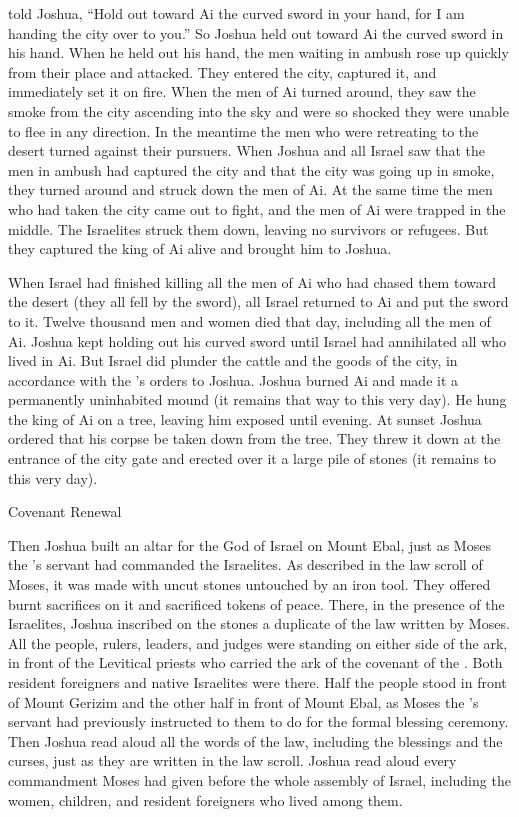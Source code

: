 {told
Joshua,
“Hold out
toward
Ai
the curved
sword in your hand,
for
I am handing
the city
over
to you.” So
Joshua
held
out toward Ai the curved
sword in his hand.
When he held
out his hand,
the men waiting
in ambush
rose
up quickly
from their place
and attacked. They entered
the city,
captured
it, and immediately
set
it on fire.
When the men
of Ai
turned
around,
they saw
the smoke
from the city
ascending
into
the sky
and were
so shocked
they were unable
to flee
in any direction.
In the meantime
the men
who were retreating
to the desert
turned
against their pursuers.
When Joshua
and all
Israel
saw
that
the men in ambush
had captured
the
city
and that
the city
was going up
in smoke,
they turned
around and struck
down the
men
of Ai.
At the same time the men
who had taken the city
came out
to fight,
and the men
of Ai were
trapped in the middle.
The Israelites
struck
them down,
leaving
no
survivors
or refugees.
But they captured
the king
of Ai
alive
and brought
him to
Joshua.
\par }{\PP {}When
Israel
had finished
killing
all
the men of Ai
who had
chased
them toward the desert
(they all
fell
by the sword), all
Israel
returned
to Ai
and put
the sword to it.
Twelve
thousand
men
and women
died
that day,
including
all
the men
of Ai.
Joshua
kept holding
out
his curved
sword until
Israel had
annihilated
all
who lived
in Ai.
But
Israel
did
plunder the cattle
and the goods
of the city,
in accordance
with the
{}’s
orders
to Joshua.
Joshua
burned
Ai
and made
it a permanently
uninhabited
mound
(it remains that way to
this
very day).
He hung
the king
of Ai
on
a tree,
leaving him exposed until
evening.
At sunset
Joshua
ordered
that his corpse
be taken down
from
the tree.
They threw
it down
at
the entrance
of the city
gate
and erected
over
it a large
pile
of stones
(it remains to this
very day).
\par }{\SH Covenant Renewal
\par }{\PP {}Then
Joshua
built
an altar
for the
{}
God
of Israel
on Mount
Ebal,
just
as Moses
the
{}’s
servant
had commanded
the Israelites.
As described in
the law
scroll
of Moses,
it was made with uncut
stones
untouched by an iron
tool.
They offered
burnt sacrifices
on
it
and sacrificed
tokens of peace.
There,
in the presence
of the Israelites,
Joshua inscribed
on
the stones
a duplicate
of the law
written
by Moses.
All
the people, rulers, leaders,
and judges
were
standing
on either
side of the ark,
in front
of the Levitical
priests
who carried
the ark
of the covenant
of the {}. Both resident foreigners
and native
Israelites
were
there. Half
the people stood in front
of Mount
Gerizim
and the other half
in front
of Mount
Ebal,
as
Moses
the
{}’s
servant
had
previously instructed
to them
to do
for the formal
blessing ceremony.
Then Joshua read
aloud
all
the words
of the law,
including the blessings
and the curses,
just
as they are written
in the law
scroll.
Joshua
read
aloud every
commandment
Moses
had given
before
the whole
assembly
of Israel,
including the women,
children,
and resident foreigners
who lived
among them.

}
